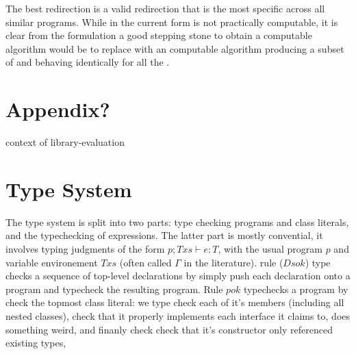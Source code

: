 The best redirection is a valid redirection
that is the most specific across all similar programs.
While  in the current form is not
practically computable, it is clear from the formulation
a good stepping stone to obtain a computable algorithm 
would be to
replace 
with an computable algorithm producing a subset of  and behaving identically for
all the .




\section{Appendix?}
\begin{bnf}
  {context of library-evaluation}\\           {}%
\end{bnf}



\section{Type System}

The type system is split into two parts: type checking programs and class literals, and the typechecking of expressions. The latter part is mostly convential, it involves typing judgments of the form $p; Txs \vdash e : T$, with the usual program $p$ and variable environement $Txs$ (often called $\Gamma$ in the literature). rule ($Ds ok$) type checks a sequence of top-level declarations by simply push each declaration onto a program and typecheck the resulting program.
Rule $p ok$ typechecks a program by check the topmost class literal: we type check each of it’s members (including all nested classes), check that it properly implements each interface it claims to, does something weird, and finanly check check that it’s constructor only referenced existing types,

